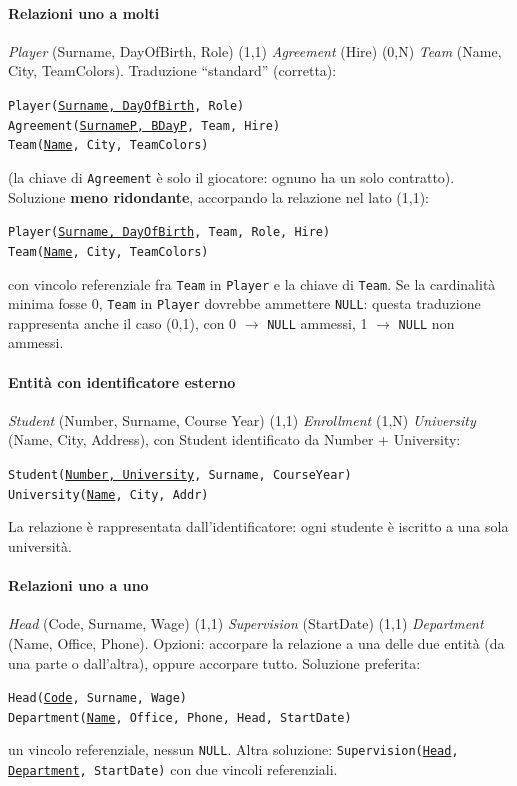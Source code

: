 \documentclass[a4paper,12pt]{article}
\begin{document}
\paragraph{Relazioni uno a molti} \emph{Player} (Surname, DayOfBirth, Role)
(1,1) \emph{Agreement} (Hire) (0,N) \emph{Team} (Name, City, TeamColors).
Traduzione ``standard'' (corretta):
\begin{center}
\texttt{Player(\underline{Surname, DayOfBirth}, Role)}\\
\texttt{Agreement(\underline{SurnameP, BDayP}, Team, Hire)}\\
\texttt{Team(\underline{Name}, City, TeamColors)}
\end{center}
(la chiave di \texttt{Agreement} è solo il giocatore: ognuno ha un solo
contratto). Soluzione \textbf{meno ridondante}, accorpando la relazione nel
lato (1,1):
\begin{center}
\texttt{Player(\underline{Surname, DayOfBirth}, Team, Role, Hire)}\\
\texttt{Team(\underline{Name}, City, TeamColors)}
\end{center}
con vincolo referenziale fra \texttt{Team} in \texttt{Player} e la chiave di
\texttt{Team}. Se la cardinalità minima fosse 0, \texttt{Team} in
\texttt{Player} dovrebbe ammettere \texttt{NULL}: questa traduzione
rappresenta anche il caso (0,1), con 0 $\to$ \texttt{NULL} ammessi, 1 $\to$
\texttt{NULL} non ammessi.

\paragraph{Entità con identificatore esterno} \emph{Student} (Number, Surname,
Course Year) (1,1) \emph{Enrollment} (1,N) \emph{University} (Name, City,
Address), con Student identificato da Number + University:
\begin{center}
\texttt{Student(\underline{Number, University}, Surname, CourseYear)}\\
\texttt{University(\underline{Name}, City, Addr)}
\end{center}
La relazione è rappresentata dall'identificatore: ogni studente è iscritto a
una sola università.

\paragraph{Relazioni uno a uno} \emph{Head} (Code, Surname, Wage) (1,1)
\emph{Supervision} (StartDate) (1,1) \emph{Department} (Name, Office, Phone).
Opzioni: accorpare la relazione a una delle due entità (da una parte o
dall'altra), oppure accorpare tutto. Soluzione preferita:
\begin{center}
\texttt{Head(\underline{Code}, Surname, Wage)}\\
\texttt{Department(\underline{Name}, Office, Phone, Head, StartDate)}
\end{center}
un vincolo referenziale, nessun \texttt{NULL}. Altra soluzione:
\texttt{Supervision(\underline{Head}, \underline{Department}, StartDate)} con
due vincoli referenziali.
\end{document}
